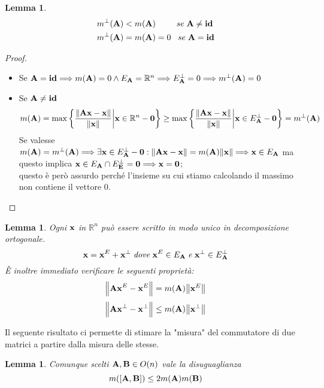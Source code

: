 \documentclass[a4paper,11pt,openright,twoside	]{book}
\newtheorem{lemma}[theorem]{Lemma}
\begin{document}
\begin{lemma}

\begin{equation}
\label{diseq:ma}
\begin{split}
m^{\perp}(\vb{A})  & < m(\vb{A}) \; \; \; \; \; \; \; \; \; se \; \vb{A \neq id}  \\
 m^{\perp}(\vb{A})  & = m(\vb{A}) = 0 \; \; \;  se \; \vb{A = id}
\end{split}
\end{equation}

\end{lemma}

\begin{proof}
\begin{itemize}
\item Se $\vb{A = id} \Longrightarrow m(\vb{A}) = 0 \land E_{\vb{A}} = \mathbb{R}^n \Longrightarrow E^{\perp}_{\vb{A}} = {0} \Longrightarrow m^{\perp}(\vb{A}) = 0$

\item Se $\vb{A \neq id}$ 
\[ m(\vb{A}) = \max \bigg\{ \frac{\norm{\vb{Ax-x}}}{\norm{\vb{x}}} \bigg|  \vb{x} \in \mathbb{R}^{n}-\vb{0} \bigg\} 
\geq \max \bigg\{ \frac{\norm{\vb{Ax-x}}}{\norm{\vb{x}}} \bigg|  \vb{x} \in E^{\perp}_{\vb{A}} - \vb{0} \bigg\} =  m^{\perp}(\vb{A}) \]
Se valesse $m(\vb{A}) = m^{\perp}(\vb{A}) \Longrightarrow \exists \vb{x} \in E^{\perp}_{\vb{A}} - \vb{0} : \norm{\vb{Ax-x}} = m(\vb{A})\norm{\vb{x}} \Longrightarrow \vb{x} \in E_{\vb{A}}$  ma questo implica $\vb{x} \in E_{\vb{A}} \cap E^{\perp}_{\vb{E}} = {\vb{0}} \Longrightarrow \vb{x = 0} $;  \\
questo è però assurdo perché l'insieme su cui stiamo calcolando il massimo non contiene il vettore $0$.
\end{itemize}
\end{proof}

\begin{lemma}
Ogni $\vb{x}$ in $\mathbb{R}^n $ può essere scritto in modo unico in decomposizione ortogonale. 
\[ \vb{x} = \vb{x}^E + \vb{x}^{\perp} \; \mathit{dove} \; \vb{x}^E \in E_{\vb{A}} \; \mathit{e} \; \vb{x}^{\perp} \in E^{\perp}_{\vb{A}} \]
\`E inoltre immediato verificare le seguenti proprietà:
\[ \norm{\vb{Ax}^E - \vb{x}^E }= m(\vb{A})\norm{\vb{x}^E} \] \[\norm{\vb{Ax}^{\perp} - \vb{x}^{\perp}} \leq m(\vb{A}) \norm{\vb{x}^{\perp}} \]
\end{lemma}

Il seguente risultato ci permette di stimare la "misura" del commutatore di due matrici a partire dalla misura delle stesse. 
\begin{lemma}
\label{lemma:2}
 Comunque scelti $\vb{ A, B} \in O(n)$ vale la disuguaglianza 
 \[ m([\vb{A,B}]) \leq 2m(\vb{A})m(\vb{B}) \]
\end{lemma}
\end{document}
